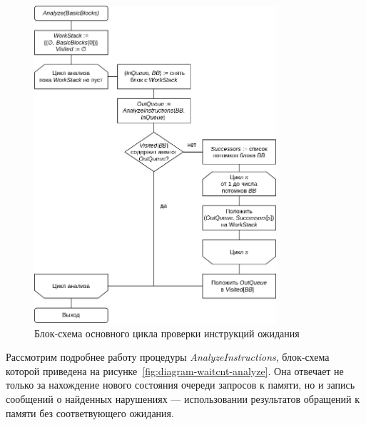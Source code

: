 \documentclass[a4paper,14pt]{extarticle}
\begin{document}
{\begin{figure}[H]
\centering
\includegraphics[width=0.8\textwidth]{diagrams/alg-waitcnt}
\caption{Блок-схема основного цикла проверки инструкций ожидания}
\label{fig:diagram-waitcnt}
\end{figure}

Рассмотрим подробнее работу процедуры \textit{AnalyzeInstructions}, блок-схема которой приведена
на рисунке~\ref{fig:diagram-waitcnt-analyze}. Она отвечает не только за нахождение нового состояния
очереди запросов к памяти, но и запись сообщений о найденных нарушениях — использовании результатов
обращений к памяти без соответвующего ожидания.

}
\end{document}
